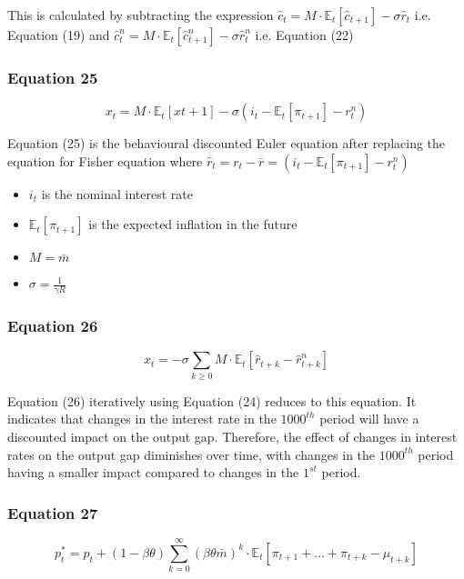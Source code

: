 \documentclass{article}
\begin{document}
This is calculated by subtracting the expression $\hat{c}_{t}=M\cdot\mathbb{E}_{t}\left[\hat{c}_{t+1}\right]-\sigma\hat{r}_{t}$ i.e. Equation (19) and $\hat{c}^{n}_{t} = M\cdot\mathbb{E}_{t}\left[\hat{c}^{n}_{t+1}\right]-\sigma\hat{r}^{n}_{t}$ i.e. Equation (22)

\subsubsection*{Equation 25}
\begin{equation}
    x_{t}=M\cdot\mathbb{E}_{t}\left[x{t+1}\right]-\sigma(i_{t}-\mathbb{E}_{t}\left[\pi_{t+1}\right]-r^{n}_{t})
\end{equation}

Equation (25) is the behavioural discounted Euler equation after replacing the equation for Fisher equation  where $\hat r_{t}= r_{t}- \bar r = (i_{t}-\mathbb{E}_{t}\left[\pi_{t+1}\right]-r^{n}_{t})$
\begin{itemize}
    \item $i_{t}$ is the nominal interest rate
    \item $\mathbb{E}_{t}\left[\pi_{t+1}\right]$ is the expected inflation in the future
    \item $M=\bar{m}$
    \item $\sigma=\frac{1}{\gamma R}$
\end{itemize}

\subsubsection*{Equation 26}
\begin{equation}
    x_{t}=-\sigma\sum_{k\geq 0}{M\cdot \mathbb{E}_{t}\left[\hat{r}_{t+k}-\hat{r}_{t+k}^{n}\right]}
\end{equation}

Equation (26) iteratively using Equation (24) reduces to this equation. It indicates that changes in the interest rate in the $1000^{th}$ period will have a discounted impact on the output gap. Therefore, the effect of changes in interest rates on the output gap diminishes over time, with changes in the $1000^{th}$ period having a smaller impact compared to changes in the $1^{st}$ period.


\subsubsection*{Equation 27}
\begin{equation}
    p^{*}_{t}=p_{t}+(1-\beta\theta)\sum_{k=0}^{\infty}\left(\beta\theta\bar{m}\right)^{k}\cdot\mathbb{E}_{t}\left[\pi_{t+1}+...+\pi_{t+k}-\mu_{t+k}\right]
\end{equation}
\end{document}
